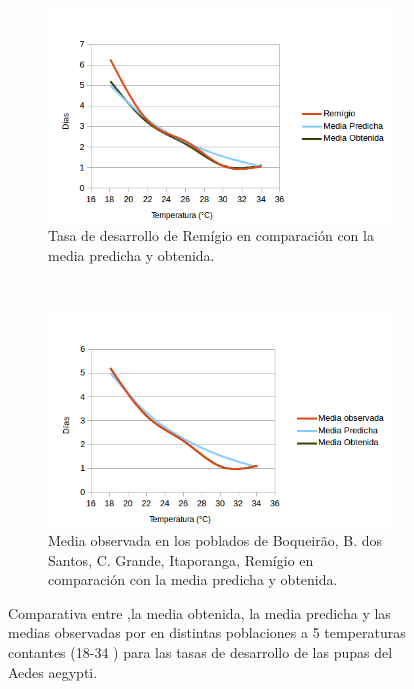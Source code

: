 \begin{figure}[!htbp]
\begin{subfigure}[b]{0.45\textwidth}
    \end{subfigure}
    \begin{subfigure}[t]{0.45\textwidth}
            \includegraphics[width=\textwidth]{capitulo-6/graphics/desarrollo-pupa-5.png}
            \caption{Tasa de desarrollo de Remígio en comparación con la media predicha y obtenida.}
    \end{subfigure}
    ~~~~
    \begin{subfigure}[t]{0.45\textwidth}
            \includegraphics[width=\textwidth]{capitulo-6/graphics/desarrollo-pupa-6.png}
            \caption{Media observada en los poblados de Boqueirão, B. dos Santos, C. Grande, Itaporanga, Remígio en comparación con la media predicha y obtenida.}

    \end{subfigure}

    \caption{\label{fig:desarrollo-pupa-baserra2006}
    Comparativa entre ,la media obtenida, la media predicha y las medias observadas por \cite{
    BESERRA2006} en distintas poblaciones a 5 temperaturas contantes (18-34 \textcelsius) para
    las tasas de desarrollo de las pupas del Aedes aegypti.}

\end{figure}
